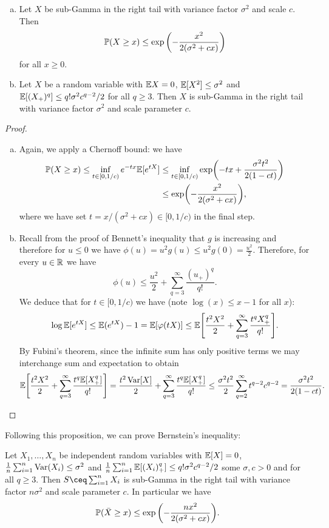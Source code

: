 \begin{proposition}
\begin{enumerate}[(a)]
\item Let $X$ be sub-Gamma in the right tail with variance factor $\sigma^2$ and scale $c$. Then 
\[
\mathbb P(X \geq x) \leq \exp\qty(-\frac{x^2}{2(\sigma^2 + cx)})
\]
for all $x \geq 0$.

\item Let $X$ be a random variable with $\mathbb E X = 0$, $\mathbb E[X^2] \leq \sigma^2$ and $\mathbb E[(X_+)^q] \leq q! \sigma^2 c^{q-2}/2$ for all $q \geq 3$. Then $X$ is sub-Gamma in the right tail with variance factor $\sigma^2$ and scale parameter $c$. 
\end{enumerate}
\end{proposition}

\begin{proof}
\begin{enumerate}[(a)]
\item Again, we apply a Chernoff bound: we have
\begin{align*}
\mathbb P(X \geq x) \leq \inf_{t \in [0, 1/c)} e^{-tx} \mathbb E[e^{tX}] &\leq \inf_{t \in [0, 1/c)} \exp(-tx + \frac{\sigma^2t^2}{2(1 - ct)}) \\
&\leq \exp(- \frac{x^2}{2(\sigma^2 + cx)}),
\end{align*}
where we have set $t = x/(\sigma^2 + cx) \in [0, 1/c)$ in the final step. 

\item Recall from the proof of Bennett's inequality that $g$ is increasing and therefore for $u \leq 0$ we have $\phi(u) = u^2 g(u) \leq u^2 g(0) = \frac{u^2}{2}$. Therefore, for every $u \in \mathbb R$ we have
\[
\phi(u) \leq \frac{u^2}{2} + \sum_{q=3}^\infty \frac{(u_+)^q}{q!}.
\]
We deduce that for $t \in [0, 1/c)$ we have (note $\log(x) \leq x - 1$ for all $x$):
\[
\log \mathbb E[e^{tX}] \leq \mathbb E(e^{tX}) - 1 = \mathbb E[\varphi(tX)] \leq \mathbb E \qty[\frac{t^2X^2}{2} + \sum_{q=3}^\infty \frac{t^q X_+^q}{q!}].
\]
By Fubini's theorem, since the infinite sum has only positive terms we may interchange sum and expectation to obtain
\[
\mathbb E \qty[\frac{t^2X^2}{2} + \sum_{q=3}^\infty \frac{t^q \mathbb E[X_+^q]}{q!}] =  \frac{t^2 \operatorname{Var}[X]}{2} + \sum_{q=3}^\infty \frac{t^q \mathbb E[X_+^q]}{q!} \leq \frac{\sigma^2 t^2}{2} \sum_{q=2}^\infty t^{q-2} c^{q-2} = \frac{\sigma^2t^2}{2(1-ct)}. 
\]
\end{enumerate}
\end{proof}

Following this proposition, we can prove Bernstein's inequality:
\begin{theorem}
	Let $X_1, \dotsc, X_n$ be independent random variables with $\mathbb E[X] = 0$, $\frac1n\sum_{i=1}^n \operatorname{Var}(X_i) \leq \sigma^2$ and $\frac1n \sum_{i=1}^n \mathbb E[(X_i)_+^q] \leq q! \sigma^2 c^{q-2}/2$ some $\sigma, c > 0$ and for all $q \geq 3$. Then $S \ceq \sum_{i=1}^n X_i$ is sub-Gamma in the right tail with variance factor $n\sigma^2$ and scale parameter $c$. In particular we have
	\[
	\mathbb P(\bar X \geq x) \leq \exp\qty(- \frac{nx^2}{2(\sigma^2 + cx)}). 
	\]
\end{theorem}

